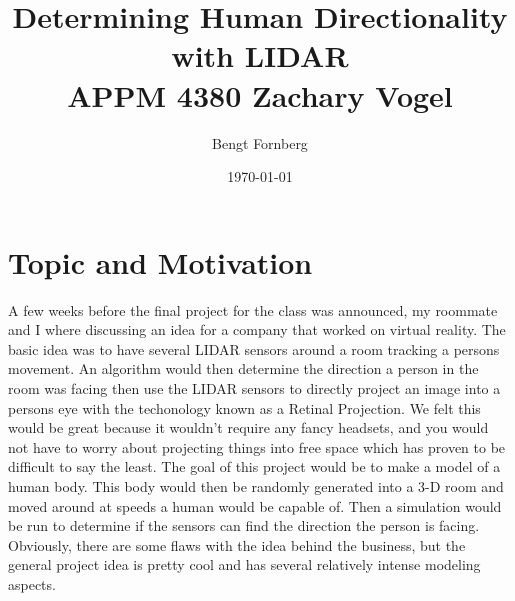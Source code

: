 \documentclass[a4paper]{article}
\author{Bengt Fornberg}
\title{Determining Human Directionality with LIDAR\\ APPM 4380   Zachary Vogel}
\date{\today}
\begin{document}
\maketitle


\section{Topic and Motivation}
A few weeks before the final project for the class was announced, my roommate and I where discussing an idea for a company that worked on virtual reality. The basic idea was to have several LIDAR sensors around a room tracking a persons movement.
An algorithm would then determine the direction a person in the room was facing then use the LIDAR sensors to directly project an image into a persons eye with the techonology known as a Retinal Projection.
We felt this would be great because it wouldn't require any fancy headsets, and you would not have to worry about projecting things into free space which has proven to be difficult to say the least.
The goal of this project would be to make a model of a human body. This body would then be randomly generated into a 3-D room and moved around at speeds a human would be capable of.
Then a simulation would be run to determine if the sensors can find the direction the person is facing.
Obviously, there are some flaws with the idea behind the business, but the general project idea is pretty cool and has several relatively intense modeling aspects.
\end{document}
